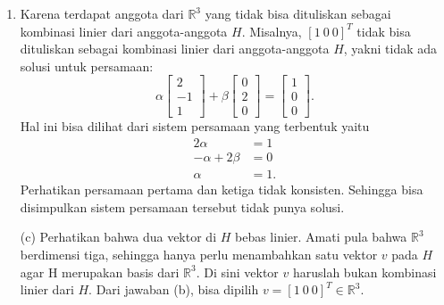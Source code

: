 \documentclass[11pt,letterpaper]{article}
\begin{document}
\begin{enumerate}
\begin{enumerate}
          \item Karena terdapat anggota dari $\mathbb{R}^3$ yang tidak bisa dituliskan sebagai kombinasi linier dari anggota-anggota $H$. Misalnya, $[1~0~0]^T$ tidak bisa dituliskan sebagai kombinasi linier dari anggota-anggota $H$, yakni tidak ada solusi untuk persamaan:
                \[
                  \alpha
                  \begin{bmatrix}
                    2 \\ -1 \\ 1
                  \end{bmatrix}
                  +
                  \beta
                  \begin{bmatrix}
                    0 \\ 2 \\ 0
                  \end{bmatrix}
                  =
                  \begin{bmatrix}
                    1 \\ 0 \\ 0
                  \end{bmatrix}.
                \]
                Hal ini bisa dilihat dari sistem persamaan yang terbentuk yaitu
                \[
                  \begin{aligned}
                    2\alpha          & = 1  \\
                    -\alpha + 2\beta & = 0  \\
                    \alpha           & = 1.
                  \end{aligned}
                \]
                Perhatikan persamaan pertama dan ketiga tidak konsisten. Sehingga bisa disimpulkan sistem persamaan tersebut tidak punya solusi.

                (c) Perhatikan bahwa dua vektor di $H$ bebas linier. Amati pula bahwa $\mathbb{R}^3$ berdimensi tiga, sehingga hanya perlu menambahkan satu vektor $v$ pada $H$ agar H merupakan basis dari $\mathbb{R}^3$. Di sini vektor $v$ haruslah bukan kombinasi linier dari $H$. Dari jawaban (b), bisa dipilih $v = [1~0~0]^T \in \mathbb{R}^3$.
        \end{enumerate}


\end{enumerate}
\end{document}
